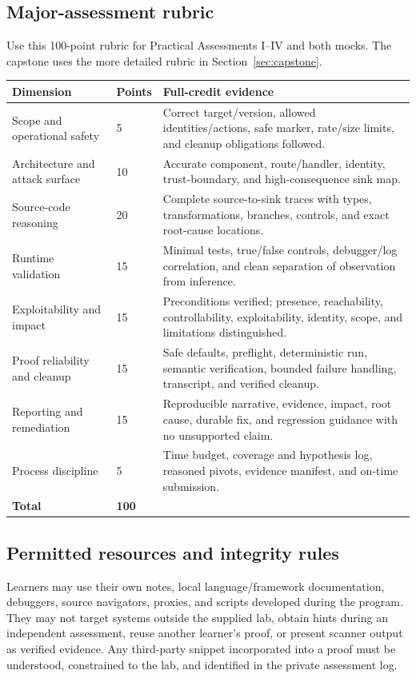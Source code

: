 \documentclass[11pt]{article}
\begin{document}
\subsection{Major-assessment rubric}

Use this 100-point rubric for Practical Assessments I--IV and both mocks. The
capstone uses the more detailed rubric in Section~\ref{sec:capstone}.

\begin{longtable}{@{}L{0.27\textwidth}L{0.08\textwidth}L{0.52\textwidth}@{}}
\toprule
\textbf{Dimension} & \textbf{Points} & \textbf{Full-credit evidence} \\
\midrule
\endhead
Scope and operational safety & 5 & Correct target/version, allowed identities/actions, safe marker, rate/size limits, and cleanup obligations followed. \\
Architecture and attack surface & 10 & Accurate component, route/handler, identity, trust-boundary, and high-consequence sink map. \\
Source-code reasoning & 20 & Complete source-to-sink traces with types, transformations, branches, controls, and exact root-cause locations. \\
Runtime validation & 15 & Minimal tests, true/false controls, debugger/log correlation, and clean separation of observation from inference. \\
Exploitability and impact & 15 & Preconditions verified; presence, reachability, controllability, exploitability, identity, scope, and limitations distinguished. \\
Proof reliability and cleanup & 15 & Safe defaults, preflight, deterministic run, semantic verification, bounded failure handling, transcript, and verified cleanup. \\
Reporting and remediation & 15 & Reproducible narrative, evidence, impact, root cause, durable fix, and regression guidance with no unsupported claim. \\
Process discipline & 5 & Time budget, coverage and hypothesis log, reasoned pivots, evidence manifest, and on-time submission. \\
\midrule
\textbf{Total} & \textbf{100} & \\
\bottomrule
\end{longtable}

\subsection{Permitted resources and integrity rules}
Learners may use their own notes, local language/framework documentation,
debuggers, source navigators, proxies, and scripts developed during the program.
They may not target systems outside the supplied lab, obtain hints during an
independent assessment, reuse another learner's proof, or present scanner output
as verified evidence. Any third-party snippet incorporated into a proof must be
understood, constrained to the lab, and identified in the private assessment log.
\end{document}
